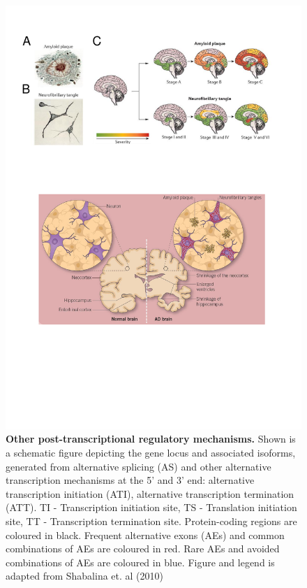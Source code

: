 \vspace{1cm}
\begin{figure}[!ht]
	\centering
	\includegraphics[page=14,trim={0 15cm 2cm 2cm},clip, scale = 0.7]{Figures/Introduction_Figures.pdf}
	\captionsetup{width=0.95\textwidth,singlelinecheck=off}
	\caption[Other post-transcriptional regulatory mechanisms]%
	{\textbf{Other post-transcriptional regulatory mechanisms.} Shown is a schematic figure depicting the gene locus and associated isoforms, generated from alternative splicing (AS) and other alternative transcription mechanisms at the 5' and 3' end: alternative transcription initiation (ATI), alternative transcription termination (ATT). \newline
	TI - Transcription initiation site, TS - Translation initiation site, TT - Transcription termination site. Protein-coding regions are coloured in black. Frequent alternative exons (AEs) and common combinations of AEs are coloured in red. Rare AEs and avoided combinations of AEs are coloured in blue. Figure and legend is adapted from Shabalina et. al (2010)\cite{Shabalina2010}
	}
	\label{fig:AS_others}
\end{figure}

